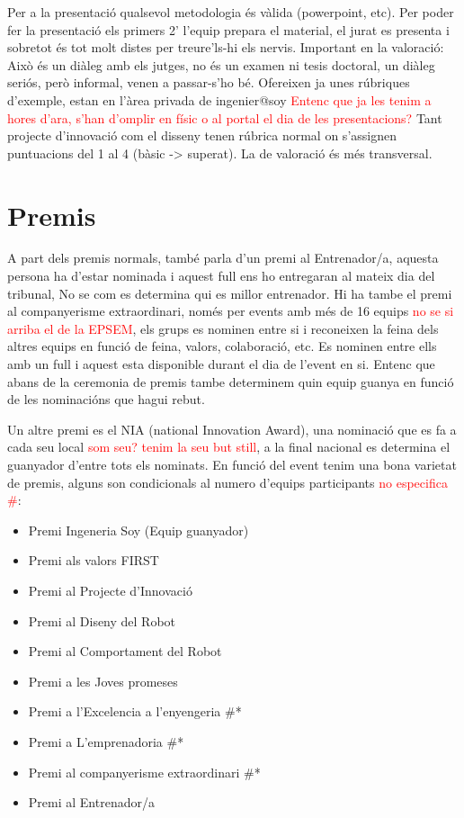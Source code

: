 \documentclass{article}
\newcommand\dubtes[1]{\textcolor{red}{#1}}
\begin{document}
\hfill \break\hfill \break
Per a la presentació qualsevol metodologia és vàlida (powerpoint, etc). Per poder fer la presentació els primers 2' l’equip prepara el material, el jurat es presenta i sobretot és tot molt distes per treure'ls-hi els nervis. Important en la valoració: Això és un diàleg amb els jutges, no és un examen ni tesis doctoral, un diàleg seriós, però informal, venen a passar-s’ho bé. 
\hfill \break\hfill \break
Ofereixen ja unes rúbriques d’exemple, estan en l’àrea privada de ingenier@soy \dubtes{Entenc que ja les tenim a hores d'ara, s'han d'omplir en físic o al portal el dia de les presentacions?}
\hfill \break\hfill \break
Tant projecte d’innovació com el disseny tenen rúbrica normal on s'assignen puntuacions del 1 al 4 (bàsic -> superat). La de valoració és més transversal.

\section{Premis}


A part dels premis normals, també parla d’un premi al Entrenador/a, aquesta persona ha d’estar nominada i aquest full ens ho entregaran al mateix dia del tribunal, No se com es determina qui es millor entrenador. 
\hfill \break\hfill \break
Hi ha tambe el premi al companyerisme extraordinari, només per events amb més de 16 equips \dubtes{no se si arriba el de la EPSEM}, els grups es nominen entre si i reconeixen la feina dels altres equips en funció de feina, valors, colaboració, etc. Es nominen entre ells amb un full i aquest esta disponible durant el dia de l’event en si. Entenc que abans de la ceremonia de premis tambe determinem quin equip guanya en funció de les nominacións que hagui rebut. 

Un altre premi es el NIA (national Innovation Award), una nominació que es fa a cada seu local \dubtes{som seu? tenim la seu but still}, a la final nacional es determina el guanyador d’entre tots els nominats.
\hfill \break\hfill \break
En funció del event tenim una bona varietat de premis, alguns son condicionals al numero d’equips participants \dubtes{no especifica \#}:

\begin{itemize}
    \item Premi Ingeneria Soy (Equip guanyador)
    \item Premi als valors FIRST
    \item Premi al Projecte d’Innovació
    \item Premi al Diseny del Robot
    \item Premi al Comportament del Robot
    \item Premi a les Joves promeses
    \item Premi a l’Excelencia a l’enyengeria \#*
    \item Premi a L’emprenadoria \#*
    \item Premi al companyerisme extraordinari \#*
    \item Premi al Entrenador/a
\end{itemize}
\end{document}
